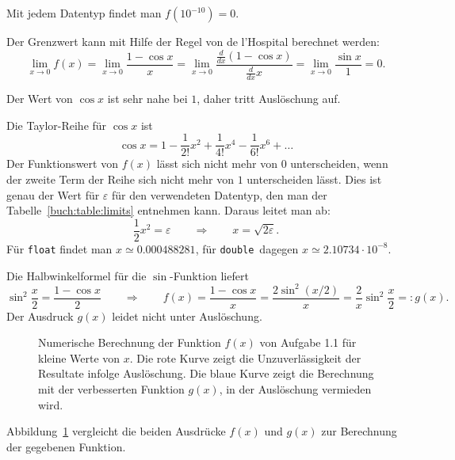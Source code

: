 \begin{loesung}
\begin{teilaufgaben}
\item
Mit jedem Datentyp findet man $f(10^{-10})=0$.
\item
Der Grenzwert kann mit Hilfe der Regel von de l'Hospital berechnet werden:
%
\[
\lim_{x\to 0}f(x)
=
\lim_{x\to 0}\frac{1-\cos x}{x}
=
\lim_{x\to 0}\frac{\frac{d}{dx}(1-\cos x)}{\frac{d}{dx} x}
=
\lim_{x\to 0} \frac{\sin x}{1} = 0.
\]
\item
Der Wert von $\cos x$ ist sehr nahe bei $1$, daher tritt Auslöschung auf.
\item
Die Taylor-Reihe für $\cos x$ ist
\[
\cos x = 1 -\frac1{2!}x^2 + \frac{1}{4!}x^4 - \frac{1}{6!}x^6 +\dots
\]
Der Funktionswert von $f(x)$ lässt sich nicht mehr von $0$ unterscheiden,
wenn der zweite Term der Reihe sich nicht mehr von $1$ unterscheiden lässt.
Dies ist genau der Wert für $\varepsilon$ für den verwendeten Datentyp,
den man der Tabelle~\ref{buch:table:limits} entnehmen kann.
\index{$\varepsilon$}%
Daraus leitet man ab:
\[
\frac12x^2 = \varepsilon
\qquad\Rightarrow\qquad
x=\sqrt{2\varepsilon}.
\]
Für \texttt{float} findet man $x\simeq 0.000488281$,
für \texttt{double} dagegen $x\simeq 2.10734\cdot 10^{-8}$.
\item
Die Halbwinkelformel für die $\sin$-Funktion liefert
%
\[
\sin^2 \frac{x}2
=
\frac{1-\cos x}{2}
\qquad\Rightarrow\qquad
f(x)
=
\frac{1-\cos x}{x}
=
\frac{2\sin^2(x/2)}{x}
=
\frac{2}{x}\sin^2\frac{x}{2}
=:
g(x).
\]
Der Ausdruck $g(x)$ leidet nicht unter Auslöschung.
%
\qedhere
\end{teilaufgaben}
\begin{figure}
\centering
{}
\caption{Numerische Berechnung der Funktion $f(x)$ von Aufgabe 1.1 für
kleine Werte von $x$.
Die rote Kurve zeigt die Unzuverlässigkeit der Resultate infolge
Auslöschung.
Die blaue Kurve zeigt die Berechnung mit der verbesserten Funktion
$g(x)$, in der Auslöschung vermieden wird.
%
\label{buch:figure:1001}}
\end{figure}
Abbildung~\ref{buch:figure:1001} vergleicht die beiden Ausdrücke
$f(x)$ und $g(x)$ zur Berechnung der gegebenen Funktion.
\end{loesung}


